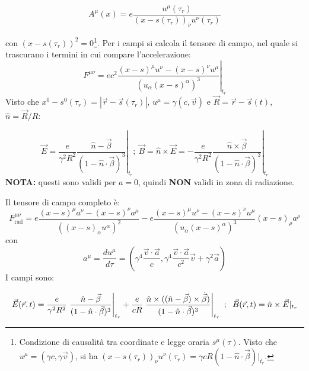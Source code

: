 \documentclass[10pt, a4paper]{scrartcl}
\newcommand*\Eval[3]{\left.#1\right\rvert_{#2}^{#3}}
\numberwithin{equation}{subsection}
\theoremstyle{style1}
\newenvironment{boxenv}[1][]{
    \begin{eqbox}[#1]
    }{
   \end{eqbox}
}
\begin{document}
\begin{boxenv}[]
\begin{equation}
	A^\mu  (x) = e \frac{u^\mu (\tau _r)}{(x-s(\tau _r))_\nu u^\nu (\tau _r)}
\end{equation}
\end{boxenv}
\noindent con $(x-s(\tau _r))^2 = 0$\footnote{Condizione di causalit\`a tra coordinate e legge oraria $s^\mu (\tau)$. Visto che $u^\mu = (\gamma c, \gamma\vec{v})$, si ha $(x-s(\tau _r))_\nu u^\nu (\tau _r) = \gamma c R (1-\hat{n} \cdot \vec{\beta })| _{t_r} $.}. Per i campi si calcola il tensore di campo, nel quale si trascurano i termini in cui compare l'accelerazione:
\begin{equation}
	F^{\mu \nu } = \Eval{ec^2 \frac{(x-s)^\mu  u^\nu  - (x-s)^\nu  u ^\mu }{(u_\alpha (x-s)^\alpha )^3}}{t_r}{}
\end{equation}
Visto che $x^0 - s^0 (\tau _r) = \left\lvert \vec{r}-\vec{s}(\tau _r) \right\rvert $, $u^\mu =\gamma(c,\vec{v})$ e $\vec{R}=\vec{r}- \vec{s}(t)$, $\hat{n}= \vec{R} / R$:
\begin{boxenv}[]
\begin{equation}
	\vec{E} = \frac{e}{\gamma^2 R^2} \Eval{\frac{\hat{n}-\vec{\beta }}{(1-\hat{n}\cdot \vec{\beta })^3}}{t_r}{}; \ \vec{B}= \hat{n}\times \vec{E} = - \frac{e}{\gamma^2 R^2} \Eval{\frac{\hat{n}\times \vec{\beta }}{(1-\hat{n}\cdot \vec{\beta })^3}
}{t_r}{}
\end{equation}
\centering\textbf{NOTA:} questi sono validi per $a=0$, quindi \textbf{NON} validi in zona di radiazione. 
\end{boxenv}
\noindent Il tensore di campo completo \`e: 
\begin{equation}
	F^{\mu \nu } _\text{rad} =e \frac{(x-s)^\mu a^\nu  - (x-s)^\nu a^\mu }{((x-s)_\alpha u^\alpha )^2} -e\frac{(x-s)^\mu  u^\nu  - (x-s)^\nu  u ^\mu }{(u_\alpha (x-s)^\alpha )^3}(x-s)_\rho a^\rho 
\end{equation}
con 
\begin{equation}
	a^\mu  = \frac{d u^\mu }{d \tau } = \left(\gamma^4 \frac{\vec{v}\cdot \vec{a}}{c}, \gamma^4 \frac{\vec{v}\cdot \vec{a}}{c^2}\vec{v} + \gamma^2 \vec{a}\right) 
\end{equation}
I campi sono:
\begin{boxenv}[]
\begin{equation}
	\vec{E}(\vec{r},t) =\frac{e}{\gamma^2 R^2}\Eval{\frac{\hat{n}-\vec{\beta }}{(1-\hat{n}\cdot \vec{\beta })^3}}{t_r}{}+\frac{e}{cR} \Eval{\frac{\hat{n}\times ((\hat{n}-\vec{\beta }) \times \dot{\vec{\beta }})}{(1-\hat{n}\cdot \vec{\beta })^3}}{t_r}{} \ ;\hspace{.2cm} \vec{B}(\vec{r},t) = \hat{n}\times \vec{E}|_{t_r} 
\end{equation}
\end{boxenv}
\end{document}
